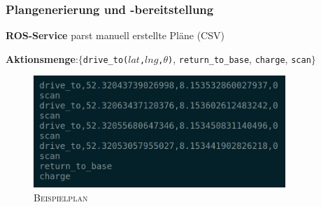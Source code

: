 \documentclass{beamer}
\newcommand{\code}[1]{\colorbox{light-gray}{\texttt{#1}}}
\begin{document}
\begin{frame}
  \frametitle{Plangenerierung und -bereitstellung}
  \textbf{ROS-Service} parst manuell erstellte Pläne (CSV)\newline
  
  \textbf{Aktionsmenge}:\newline $\{$\code{drive\_to($lat$,$lng$,$\theta$)}, \code{return\_to\_base}, \code{charge}, \code{scan}$\}$
  \begin{figure}[H]
    \centering
    \includegraphics[width=0.85\textwidth]{img/plan_example.png}
    \caption*{\textsc{Beispielplan}}
  \end{figure}
\end{frame}
\end{document}
